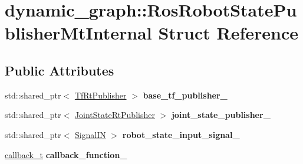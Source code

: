 \hypertarget{structdynamic__graph_1_1RosRobotStatePublisherMtInternal}{}\section{dynamic\+\_\+graph\+:\+:Ros\+Robot\+State\+Publisher\+Mt\+Internal Struct Reference}
\label{structdynamic__graph_1_1RosRobotStatePublisherMtInternal}
\subsection*{Public Attributes}
\begin{DoxyCompactItemize}
\item 
\mbox{\label{structdynamic__graph_1_1RosRobotStatePublisherMtInternal_aab90866aadd382e54d32f7fef36a2104}} 
std\+::shared\+\_\+ptr$<$ \hyperlink{namespacedynamic__graph_ac8d567b9a3d1ab846ba2efdc1ff1e120}{Tf\+Rt\+Publisher} $>$ {\bfseries base\+\_\+tf\+\_\+publisher\+\_\+}
\item 
\mbox{\label{structdynamic__graph_1_1RosRobotStatePublisherMtInternal_a3d4474426dd6e6b7be683e0f3e9bbe93}} 
std\+::shared\+\_\+ptr$<$ \hyperlink{namespacedynamic__graph_ae9ad83c8174a9aa5bc1688df02b4ee95}{Joint\+State\+Rt\+Publisher} $>$ {\bfseries joint\+\_\+state\+\_\+publisher\+\_\+}
\item 
\mbox{\label{structdynamic__graph_1_1RosRobotStatePublisherMtInternal_a3ac5d56e51dc8a49b75e73e5d4eddad0}} 
std\+::shared\+\_\+ptr$<$ \hyperlink{namespacedynamic__graph_ae1463c695a6915ea3f9ab4311beb527a}{Signal\+IN} $>$ {\bfseries robot\+\_\+state\+\_\+input\+\_\+signal\+\_\+}
\item 
\mbox{\label{structdynamic__graph_1_1RosRobotStatePublisherMtInternal_adc98e11fb54943fc891977203d0c68fd}} 
\hyperlink{namespacedynamic__graph_adf7d40f2a8d1425af80c14f90e58e961}{callback\+\_\+t} {\bfseries callback\+\_\+function\+\_\+}
\item 
\mbox{\label{structdynamic__graph_1_1RosRobotStatePublisherMtInternal_a5df491b287f390cfafcc173181981b25}} 

\end{DoxyCompactItemize}

